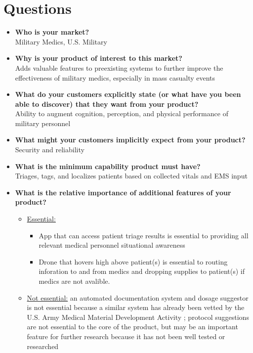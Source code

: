 \documentclass[man]{article}
\begin{document}
  \section{Questions}
    \begin{itemize}
      \item \textbf{Who is your market?}
      ~\\Military Medics, U.S. Military

      \item \textbf{Why is your product of interest to this market?}
      ~\\Adds valuable features to preexisting systems to further improve the effectiveness of military medics, especially in mass casualty events

      \item \textbf{What do your customers explicitly state (or what have you been able to discover) that they want from your product?}
      ~\\Ability to augment cognition, perception, and physical performance of military personnel

      \item \textbf{What might your customers implicitly expect from your product?}
      ~\\Security and reliability

      \item \textbf{What is the minimum capability product must have?}
      ~\\Triages, tags, and localizes patients based on collected vitals and EMS input

      \item \textbf{What is the relative importance of additional features of your product?}
      \begin{itemize}
        \item \underline{Essential:}
        \begin{itemize}
          \item App that can access patient triage results is essential to providing all relevant medical personnel situational awareness
          \item Drone that hovers high above patient(s) is essential to routing inforation to and from medics and dropping supplies to patient(s) if medics are not avalible.
        \end{itemize}

        \item \underline{Not essential:} an automated documentation system and dosage suggestor is not essential because a similar system has already been vetted by the U.S. Army Medical Material Development Activity \cite{medhub}; protocol suggestions are not essential to the core of the product, but may be an important feature for further research because it has not been well tested or researched
      \end{itemize}
      \newpage


\end{itemize}
\end{document}
